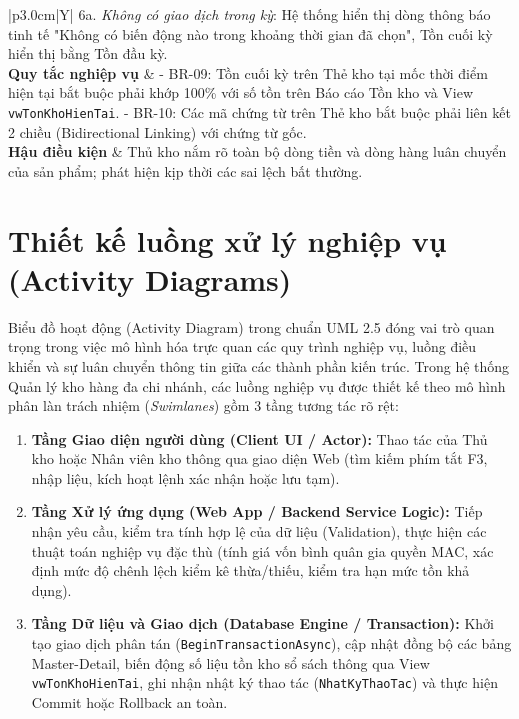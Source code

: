 \documentclass[12pt,a4paper]{report}
\renewcommand{\_}{\textunderscore\allowbreak}
\begin{document}
\begin{table}[H]
\begin{tabularx}{\textwidth}{|p{3.0cm}|Y|}
{6a. \textit{Không có giao dịch trong kỳ}: Hệ thống hiển thị dòng thông báo tinh tế "Không có biến động nào trong khoảng thời gian đã chọn", Tồn cuối kỳ hiển thị bằng Tồn đầu kỳ.
} \\
\hline
\textbf{Quy tắc nghiệp vụ} & - BR-09: Tồn cuối kỳ trên Thẻ kho tại mốc thời điểm hiện tại bắt buộc phải khớp 100\% với số tồn trên Báo cáo Tồn kho và View \texttt{vw\_TonKhoHienTai}.\newline
- BR-10: Các mã chứng từ trên Thẻ kho bắt buộc phải liên kết 2 chiều (Bidirectional Linking) với chứng từ gốc. \\
\hline
\textbf{Hậu điều kiện} & Thủ kho nắm rõ toàn bộ dòng tiền và dòng hàng luân chuyển của sản phẩm; phát hiện kịp thời các sai lệch bất thường. \\
\hline
\end{tabularx}
\caption{Bảng đặc tả Use Case UC-05: Tra cứu Thẻ kho và Phân tích Biến động Lũy kế}
\label{tab:uc_spec_thekho}
\end{table}

\clearpage

\section{Thiết kế luồng xử lý nghiệp vụ (Activity Diagrams)}

Biểu đồ hoạt động (Activity Diagram) trong chuẩn UML 2.5 đóng vai trò quan trọng trong việc mô hình hóa trực quan các quy trình nghiệp vụ, luồng điều khiển và sự luân chuyển thông tin giữa các thành phần kiến trúc. Trong hệ thống Quản lý kho hàng đa chi nhánh, các luồng nghiệp vụ được thiết kế theo mô hình phân làn trách nhiệm (\textit{Swimlanes}) gồm 3 tầng tương tác rõ rệt:
\begin{enumerate}
    \item \textbf{Tầng Giao diện người dùng (Client UI / Actor):} Thao tác của Thủ kho hoặc Nhân viên kho thông qua giao diện Web (tìm kiếm phím tắt F3, nhập liệu, kích hoạt lệnh xác nhận hoặc lưu tạm).
    \item \textbf{Tầng Xử lý ứng dụng (Web App / Backend Service Logic):} Tiếp nhận yêu cầu, kiểm tra tính hợp lệ của dữ liệu (Validation), thực hiện các thuật toán nghiệp vụ đặc thù (tính giá vốn bình quân gia quyền MAC, xác định mức độ chênh lệch kiểm kê thừa/thiếu, kiểm tra hạn mức tồn khả dụng).
    \item \textbf{Tầng Dữ liệu và Giao dịch (Database Engine / Transaction):} Khởi tạo giao dịch phân tán (\texttt{BeginTransactionAsync}), cập nhật đồng bộ các bảng Master-Detail, biến động số liệu tồn kho sổ sách thông qua View \texttt{vw\_TonKhoHienTai}, ghi nhận nhật ký thao tác (\texttt{NhatKyThaoTac}) và thực hiện Commit hoặc Rollback an toàn.
\end{enumerate}
\end{document}
